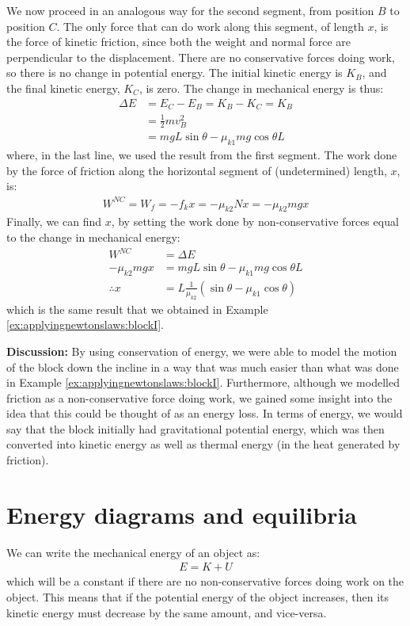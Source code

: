 \begin{example}
We now proceed in an analogous way for the second segment, from position $B$ to position $C$. The only force that can do work along this segment, of length $x$, is the force of kinetic friction, since both the weight and normal force are perpendicular to the displacement. There are no conservative forces doing work, so there is no change in potential energy. The initial kinetic energy is $K_B$, and the final kinetic energy, $K_C$, is zero. The change in mechanical energy is thus:
\begin{align*}
\Delta E &= E_C - E_B = K_B - K_C = K_B\\
&=\frac{1}{2}mv_B^2\\
&= mgL\sin\theta-\mu_{k1}mg\cos\theta L 
\end{align*}
where, in the last line, we used the result from the first segment. The work done by the force of friction along the horizontal segment of (undetermined) length, $x$, is:
\begin{align*}
W^{NC}=W_f = -f_kx = -\mu_{k2} N x=-\mu_{k2} mg x
\end{align*}
Finally, we can find $x$, by setting the work done by non-conservative forces equal to the change in mechanical energy:
\begin{align*}
W^{NC} &= \Delta E\\
-\mu_{k2} mg x &= mgL\sin\theta-\mu_{k1}mg\cos\theta L \\
\therefore x&= L\frac{1}{\mu_{k2}}\left(\sin\theta - \mu_{k1}\cos\theta\right)
\end{align*}
which is the same result that we obtained in Example \ref{ex:applyingnewtonslaws:blockI}.

\textbf{Discussion:} By using conservation of energy, we were able to model the motion of the block down the incline in a way that was much easier than what was done in Example \ref{ex:applyingnewtonslaws:blockI}. Furthermore, although we modelled friction as a non-conservative force doing work, we gained some insight into the idea that this could be thought of as an energy loss. In terms of energy, we would say that the block initially had gravitational potential energy, which was then converted into kinetic energy as well as thermal energy (in the heat generated by friction). 
\end{example}

\section{Energy diagrams and equilibria}
\label{sec:potentialecons:ediagrams}
We can write the mechanical energy of an object as:
\begin{align*}
E = K + U
\end{align*}
which will be a constant if there are no non-conservative forces doing work on the object. This means that if the potential energy of the object increases, then its kinetic energy must decrease by the same amount, and vice-versa. 

